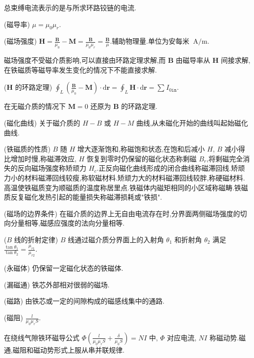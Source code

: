     总束缚电流表示的是与所求环路铰链的电流.
    \begin{definition}
        (磁导率) $\mu=\mu_0\mu_{r}$.
    \end{definition}
    \begin{definition}
        (磁场强度) $\bm{H}=\frac{\bm{B}}{\mu_0}-\bm{M}=\frac{\bm{B}}{\mu_0\mu_{r}}=\frac{\bm{B}}{\mu}$.辅助物理量.单位为安每米 $\ \mathrm{A / m}$.
    \end{definition}
    磁场强度不受磁介质影响,可以直接由环路定理求解,而 $\bm{B}$ 由磁导率从 $\bm{H}$ 间接求解,在铁磁质等磁导率发生变化的情况下不能直接求解.
    \begin{theorem}
        ($\bm{H}$ 的环路定理) $\oint_{L}^{}\left( \frac{\bm{B}}{\mu_0}-\bm{M} \right) \cdot \mathrm{d}\bm{r}=\oint_{L}^{}\bm{H}\cdot \mathrm{d}\bm{r}=\sum_{}^{}I_{0\texttt{in}}$.
    \end{theorem}
    在无磁介质的情况下 $\bm{M}=0$ 还原为 $\bm{B}$ 的环路定理.
    \begin{definition}
        (磁化曲线) 关于磁介质的 $H-B$ 或 $H-M$ 曲线,从未磁化开始的曲线叫起始磁化曲线.
    \end{definition}
    \begin{definition}
    (铁磁质的性质) $B$ 随 $H$ 增大逐渐饱和,称磁饱和状态,在饱和后减小 $H$, $B$ 减小得比增加时慢,称磁滞效应, $H$ 恢复到零时仍保留的磁化状态称剩磁 $B_{r}$,将剩磁完全消失的反向磁场强度称矫顽力 $H_{c}$.正反向磁化曲线形成的闭合曲线称磁滞回线.矫顽力小的材料磁滞回线较瘦,称软磁材料.矫顽力大的材料磁滞回线较胖,称硬磁材料.高温使铁磁质变为顺磁质的温度称居里点.铁磁体内磁矩相同的小区域称磁畴.铁磁质反复磁化发热引起的能量损失称磁滞损耗或"铁损".
    \end{definition}
    \begin{theorem}
        (磁场的边界条件) 在磁介质的边界上无自由电流存在时,分界面两侧磁场强度的切向分量相等,磁感应强度的法向分量相等.
    \end{theorem}
    \begin{theorem}
        ($B$ 线的折射定律) $B$ 线通过磁介质分界面上的入射角 $\theta_1$ 和折射角 $\theta_2$ 满足 $\frac{\tan\theta_1}{\tan\theta_2}=\frac{\mu_{r 1}}{\mu _{r 2}}$.
    \end{theorem}
    \begin{definition}
        (永磁体) 仍保留一定磁化状态的铁磁体.
    \end{definition}
    \begin{definition}
        (漏磁通) 铁芯外部相对很弱的磁场.
    \end{definition}
    \begin{definition}
        (磁路) 由铁芯或一定的间隙构成的磁感线集中的通路.
    \end{definition}
    \begin{definition}
        (磁阻) $\frac{l}{\mu_0\mu_{r}S}$.
    \end{definition}
    在绕线气隙铁环磁导公式 $\Phi\left( \frac{l}{\mu_0\mu_{r}S}+\frac{\delta}{\mu_0S} \right) =NI$ 中, $\Phi$ 对应电流, $NI$ 称磁动势.磁通,磁阻和磁动势形式上服从串并联规律.
